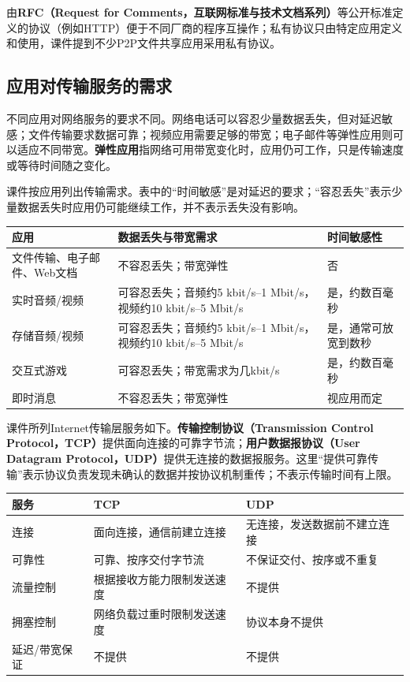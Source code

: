由\textbf{RFC（Request for Comments，互联网标准与技术文档系列）}等公开标准定义的协议（例如HTTP）便于不同厂商的程序互操作；私有协议只由特定应用定义和使用，课件提到不少P2P文件共享应用采用私有协议。

\subsection{应用对传输服务的需求}
不同应用对网络服务的要求不同。网络电话可以容忍少量数据丢失，但对延迟敏感；文件传输要求数据可靠；视频应用需要足够的带宽；电子邮件等弹性应用则可以适应不同带宽。\textbf{弹性应用}指网络可用带宽变化时，应用仍可工作，只是传输速度或等待时间随之变化。

课件按应用列出传输需求。表中的“时间敏感”是对延迟的要求；“容忍丢失”表示少量数据丢失时应用仍可能继续工作，并不表示丢失没有影响。
\begin{center}\begin{tabularx}{.98\textwidth}{lXX}
\toprule 应用 & 数据丢失与带宽需求 & 时间敏感性 \\
\midrule
文件传输、电子邮件、Web文档 & 不容忍丢失；带宽弹性 & 否 \\
实时音频/视频 & 可容忍丢失；音频约5 kbit/s--1 Mbit/s，视频约10 kbit/s--5 Mbit/s & 是，约数百毫秒 \\
存储音频/视频 & 可容忍丢失；音频约5 kbit/s--1 Mbit/s，视频约10 kbit/s--5 Mbit/s & 是，通常可放宽到数秒 \\
交互式游戏 & 可容忍丢失；带宽需求为几kbit/s & 是，约数百毫秒 \\
即时消息 & 不容忍丢失；带宽弹性 & 视应用而定 \\
\bottomrule
\end{tabularx}\end{center}

课件所列Internet传输层服务如下。\textbf{传输控制协议（Transmission Control Protocol，TCP）}提供面向连接的可靠字节流；\textbf{用户数据报协议（User Datagram Protocol，UDP）}提供无连接的数据报服务。这里“提供可靠传输”表示协议负责发现未确认的数据并按协议机制重传；不表示传输时间有上限。

\begin{center}\begin{tabularx}{.96\textwidth}{lXX}\toprule
服务 & TCP & UDP \\\midrule
连接 & 面向连接，通信前建立连接 & 无连接，发送数据前不建立连接 \\
可靠性 & 可靠、按序交付字节流 & 不保证交付、按序或不重复 \\
流量控制 & 根据接收方能力限制发送速度 & 不提供 \\
拥塞控制 & 网络负载过重时限制发送速度 & 协议本身不提供 \\
延迟/带宽保证 & 不提供 & 不提供 \\\bottomrule\end{tabularx}\end{center}

